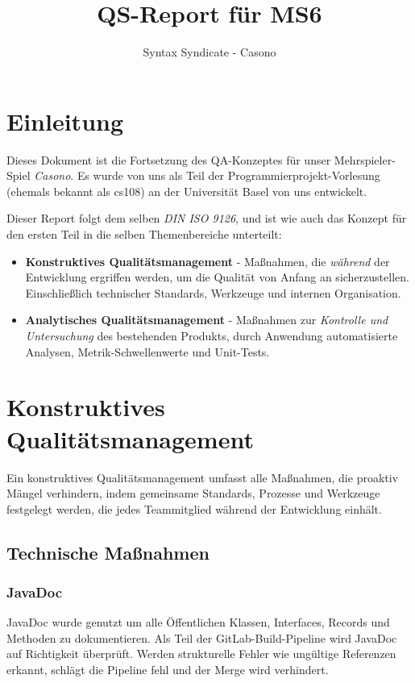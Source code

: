 \documentclass{article}
\title{QS-Report für MS6}
\author{Syntax Syndicate - Casono}
\begin{document}
\maketitle

\section{Einleitung}
Dieses Dokument ist die Fortsetzung des QA-Konzeptes für unser Mehrspieler-Spiel \textit{Casono}.
Es wurde von uns als Teil der Programmierprojekt-Vorlesung (ehemals bekannt als cs108) an der Universität Basel von uns entwickelt.

Dieser Report folgt dem selben \textit{DIN ISO 9126}, und ist wie auch das Konzept für den ersten Teil in die selben Themenbereiche unterteilt:
\begin{itemize}
  \item \textbf{Konstruktives Qualitätsmanagement} - Maßnahmen, die \emph{während} der Entwicklung ergriffen werden, um die Qualität von Anfang an sicherzustellen.
  Einschließlich technischer Standards, Werkzeuge und internen Organisation.
  \item \textbf{Analytisches Qualitätsmanagement} - Maßnahmen zur \emph{Kontrolle und Untersuchung} des bestehenden Produkts, durch Anwendung automatisierte Analysen, Metrik-Schwellenwerte und Unit-Tests.
\end{itemize}

\section{Konstruktives Qualitätsmanagement}
Ein konstruktives Qualitätsmanagement umfasst alle Maßnahmen, die proaktiv Mängel verhindern, indem gemeinsame Standards, Prozesse und Werkzeuge festgelegt werden, die jedes Teammitglied während der Entwicklung einhält.

\subsection{Technische Maßnahmen}

\subsubsection{JavaDoc}
JavaDoc wurde genutzt um alle Öffentlichen Klassen, Interfaces, Records und Methoden zu dokumentieren.
Als Teil der GitLab-Build-Pipeline wird JavaDoc auf Richtigkeit überprüft. Werden strukturelle Fehler wie ungültige Referenzen erkannt, schlägt die Pipeline fehl und der Merge wird verhindert.\\
\end{document}
